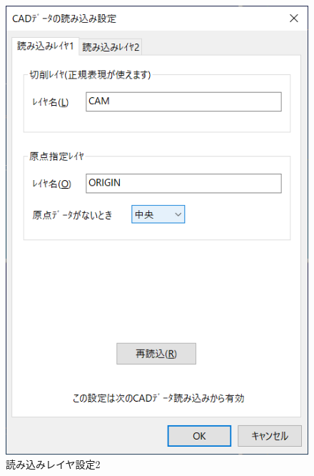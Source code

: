 \begin{minipage}{0.5\textwidth}
\begin{figure}[H]
\centering
\includegraphics[scale=0.7]{No2/fig/ReadSetup2.png}
\caption{読み込みレイヤ設定2}
\label{fig:ReadSetup2.png}
\end{figure}
\end{minipage}
